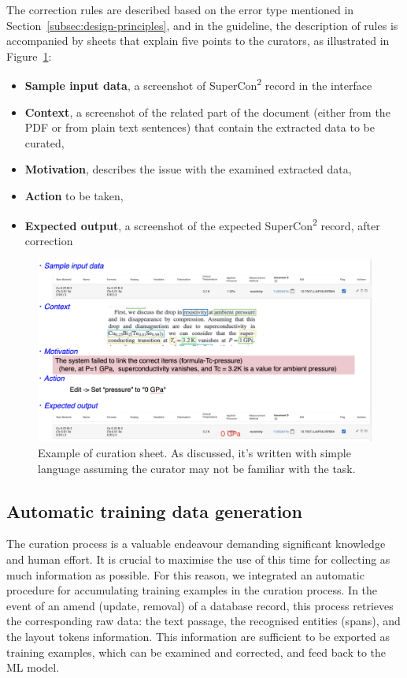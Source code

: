 \documentclass[a4paper]{article}
\begin{document}
The correction rules are described based on the error type mentioned in Section~\ref{subsec:design-principles}, and in the guideline, the description of rules is accompanied by sheets that explain five points to the curators, as illustrated in Figure~\ref{fig:example-curation-sheet}:
\begin{itemize}
    \item \textbf{Sample input data}, a screenshot of SuperCon\textsuperscript{2} record in the interface
    \item \textbf{Context}, a screenshot of the related part of the document (either from the PDF or from plain text sentences) that contain the extracted data to be curated,
    \item \textbf{Motivation}, describes the issue with the examined extracted data, 
    \item \textbf{Action} to be taken, 
    \item \textbf{Expected output}, a screenshot of the expected SuperCon\textsuperscript{2} record, after correction
\end{itemize}


\begin{figure}[ht]
  \centering
  \includegraphics[width=1\textwidth]{images/example-sheet-curation.png} 
  \caption{Example of curation sheet. As discussed, it's written with simple language assuming the curator may not be familiar with the task. }
  \label{fig:example-curation-sheet}
\end{figure}


\subsection{Automatic training data generation}
\label{subsec:feedback-loop-training-data}
The curation process is a valuable endeavour demanding significant knowledge and human effort. 
It is crucial to maximise the use of this time for collecting as much information as possible.
For this reason, we integrated an automatic procedure for accumulating training examples in the curation process. 
In the event of an amend (update, removal) of a database record, this process retrieves the corresponding raw data: the text passage, the recognised entities (spans), and the layout tokens information. 
This information are sufficient to be exported as training examples, which can be examined and corrected, and feed back to the ML model. 
\end{document}
